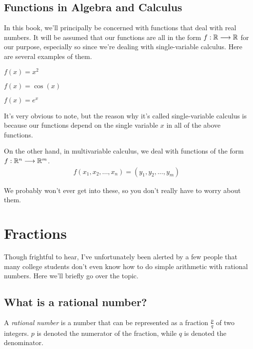 \subsection{Functions in Algebra and Calculus}

In this book, we'll principally be concerned with functions that deal with real numbers. It will be assumed that our functions are all in the form $f : \mathbb{R} \longrightarrow \mathbb{R}$ for our purpose, especially so since we're dealing with single-variable calculus. Here are several examples of them.

\begin{example}
$f(x) = x^2$
\end{example}

\begin{example}
$f(x) = \cos(x)$
\end{example}

\begin{example}
$f(x) = e^x$
\end{example}

It's very obvious to note, but the reason why it's called single-variable calculus is because our functions depend on the single variable $x$ in all of the above functions. 

On the other hand, in multivariable calculus, we deal with functions of the form $f : \mathbb{R}^n \longrightarrow \mathbb{R}^m$. 
\begin{align*}
    f(x_1, x_2, ..., x_n) = (y_1, y_2, ..., y_m)
\end{align*}

We probably won't ever get into these, so you don't really have to worry about them. 

\section{Fractions}

Though frightful to hear, I've unfortunately been alerted by a few people that many college students don't even know how to do simple arithmetic with rational numbers. Here we'll briefly go over the topic.

\subsection{What is a rational number?}

\begin{definition}
A \textit{rational number} is a number that can be represented as a fraction $\frac{p}{q}$ of two integers. $p$ is denoted the numerator of the fraction, while $q$ is denoted the denominator. 
\end{definition}

